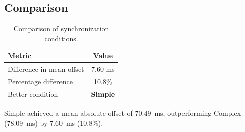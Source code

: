 \subsection*{Comparison}

\begin{table}[h!]
\centering
\begin{tabular}{|l|c|}
\hline
Metric & Value \\
\hline
Difference in mean offset & 7.60 ms \\
Percentage difference & 10.8\% \\
Better condition & \textbf{Simple} \\
\hline
\end{tabular}
\caption{Comparison of synchronization conditions.}
\label{tab:sync_comparison}
\end{table}

Simple achieved a mean absolute offset of 70.49~ms, outperforming Complex (78.09~ms) by 7.60~ms (10.8\%).
